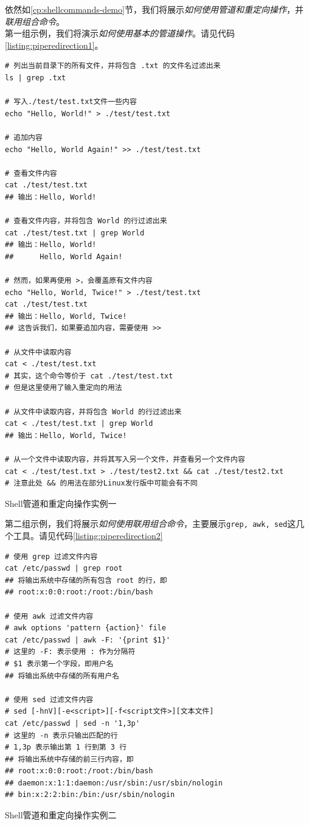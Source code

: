 依然如\ref{cp:shellcommands-demo}节，我们将展示\textit{如何使用管道和重定向操作}，并\textit{联用组合命令}。\\

第一组示例，我们将演示\textit{如何使用基本的管道操作}。请见代码\ref{listing:piperedirection1}。

\begin{longlisting}
    \begin{verbatim}
# 列出当前目录下的所有文件，并将包含 .txt 的文件名过滤出来
ls | grep .txt

# 写入./test/test.txt文件一些内容
echo "Hello, World!" > ./test/test.txt

# 追加内容
echo "Hello, World Again!" >> ./test/test.txt

# 查看文件内容
cat ./test/test.txt
## 输出：Hello, World!

# 查看文件内容，并将包含 World 的行过滤出来
cat ./test/test.txt | grep World
## 输出：Hello, World!
##      Hello, World Again!

# 然而，如果再使用 >，会覆盖原有文件内容
echo "Hello, World, Twice!" > ./test/test.txt
cat ./test/test.txt
## 输出：Hello, World, Twice!
## 这告诉我们，如果要追加内容，需要使用 >>

# 从文件中读取内容
cat < ./test/test.txt
# 其实，这个命令等价于 cat ./test/test.txt
# 但是这里使用了输入重定向的用法

# 从文件中读取内容，并将包含 World 的行过滤出来
cat < ./test/test.txt | grep World
## 输出：Hello, World, Twice!

# 从一个文件中读取内容，并将其写入另一个文件，并查看另一个文件内容
cat < ./test/test.txt > ./test/test2.txt && cat ./test/test2.txt
# 注意此处 && 的用法在部分Linux发行版中可能会有不同
    \end{verbatim}
    \caption{Shell管道和重定向操作实例一}
    \label{listing:piperedirection1}

\end{longlisting}

第二组示例，我们将展示\textit{如何使用联用组合命令}，主要展示\texttt{grep, awk, sed}这几个工具。请见代码\ref{listing:piperedirection2}

\begin{longlisting}
    \begin{verbatim}
# 使用 grep 过滤文件内容
cat /etc/passwd | grep root
## 将输出系统中存储的所有包含 root 的行，即
## root:x:0:0:root:/root:/bin/bash

# 使用 awk 过滤文件内容
# awk options 'pattern {action}' file
cat /etc/passwd | awk -F: '{print $1}'
# 这里的 -F: 表示使用 : 作为分隔符
# $1 表示第一个字段，即用户名
## 将输出系统中存储的所有用户名

# 使用 sed 过滤文件内容
# sed [-hnV][-e<script>][-f<script文件>][文本文件]
cat /etc/passwd | sed -n '1,3p'
# 这里的 -n 表示只输出匹配的行
# 1,3p 表示输出第 1 行到第 3 行
## 将输出系统中存储的前三行内容，即
## root:x:0:0:root:/root:/bin/bash
## daemon:x:1:1:daemon:/usr/sbin:/usr/sbin/nologin
## bin:x:2:2:bin:/bin:/usr/sbin/nologin
    \end{verbatim}
    \caption{Shell管道和重定向操作实例二}
    \label{listing:piperedirection2}
\end{longlisting}

